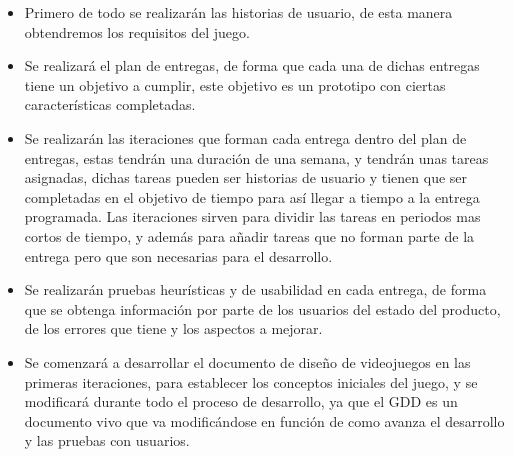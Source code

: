 \begin{itemize}
  \item Primero de todo se realizarán las historias de usuario, de esta manera obtendremos los requisitos del juego.
  \item Se realizará el plan de entregas, de forma que cada una de dichas entregas tiene un objetivo a cumplir, este objetivo es un prototipo con ciertas características completadas.
  \item Se realizarán las iteraciones que forman cada entrega dentro del plan de entregas, estas tendrán una duración de una semana, y tendrán unas tareas asignadas, dichas tareas pueden ser historias de usuario y tienen que ser completadas en el objetivo de tiempo para así llegar a tiempo a la entrega programada. Las iteraciones sirven para dividir las tareas en periodos mas cortos de tiempo, y además para añadir tareas que no forman parte de la entrega pero que son necesarias para el desarrollo.
  \item Se realizarán pruebas heurísticas y de usabilidad en cada entrega, de forma que se obtenga información por parte de los usuarios del estado del producto, de los errores que tiene y los aspectos a mejorar.
  \item Se comenzará a desarrollar el documento de diseño de videojuegos en las primeras iteraciones, para establecer los conceptos iniciales del juego, y se modificará durante todo el proceso de desarrollo, ya que el GDD es un documento vivo que va modificándose en función de como avanza el desarrollo y las pruebas con usuarios.
\end{itemize}
